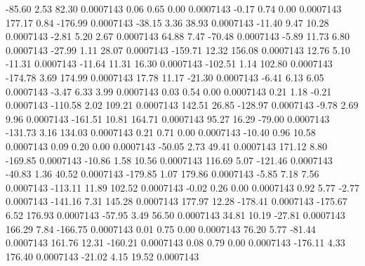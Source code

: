       -85.60        2.53       82.30     0.0007143
        0.06        0.65        0.00     0.0007143
       -0.17        0.74        0.00     0.0007143
      177.17        0.84     -176.99     0.0007143
      -38.15        3.36       38.93     0.0007143
      -11.40        9.47       10.28     0.0007143
       -2.81        5.20        2.67     0.0007143
       64.88        7.47      -70.48     0.0007143
       -5.89       11.73        6.80     0.0007143
      -27.99        1.11       28.07     0.0007143
     -159.71       12.32      156.08     0.0007143
       12.76        5.10      -11.31     0.0007143
      -11.64       11.31       16.30     0.0007143
     -102.51        1.14      102.80     0.0007143
     -174.78        3.69      174.99     0.0007143
       17.78       11.17      -21.30     0.0007143
       -6.41        6.13        6.05     0.0007143
       -3.47        6.33        3.99     0.0007143
        0.03        0.54        0.00     0.0007143
        0.21        1.18       -0.21     0.0007143
     -110.58        2.02      109.21     0.0007143
      142.51       26.85     -128.97     0.0007143
       -9.78        2.69        9.96     0.0007143
     -161.51       10.81      164.71     0.0007143
       95.27       16.29      -79.00     0.0007143
     -131.73        3.16      134.03     0.0007143
        0.21        0.71        0.00     0.0007143
      -10.40        0.96       10.58     0.0007143
        0.09        0.20        0.00     0.0007143
      -50.05        2.73       49.41     0.0007143
      171.12        8.80     -169.85     0.0007143
      -10.86        1.58       10.56     0.0007143
      116.69        5.07     -121.46     0.0007143
      -40.83        1.36       40.52     0.0007143
     -179.85        1.07      179.86     0.0007143
       -5.85        7.18        7.56     0.0007143
     -113.11       11.89      102.52     0.0007143
       -0.02        0.26        0.00     0.0007143
        0.92        5.77       -2.77     0.0007143
     -141.16        7.31      145.28     0.0007143
      177.97       12.28     -178.41     0.0007143
     -175.67        6.52      176.93     0.0007143
      -57.95        3.49       56.50     0.0007143
       34.81       10.19      -27.81     0.0007143
      166.29        7.84     -166.75     0.0007143
        0.01        0.75        0.00     0.0007143
       76.20        5.77      -81.44     0.0007143
      161.76       12.31     -160.21     0.0007143
        0.08        0.79        0.00     0.0007143
     -176.11        4.33      176.40     0.0007143
      -21.02        4.15       19.52     0.0007143

